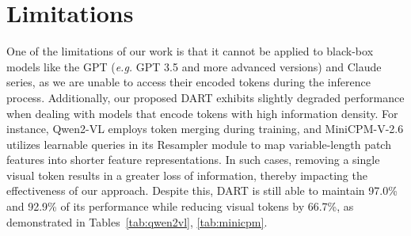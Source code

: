\section{Limitations}
One of the limitations of our work is that it cannot be applied to black-box models like the GPT (\emph{e.g.} GPT 3.5 and more advanced versions) and Claude series, as we are unable to access their encoded tokens during the inference process. Additionally, our proposed DART exhibits slightly degraded performance when dealing with models that encode tokens with high information density. For instance, Qwen2-VL employs token merging during training, and MiniCPM-V-2.6 utilizes learnable queries in its Resampler module to map variable-length patch features into shorter feature representations. In such cases, removing a single visual token results in a greater loss of information, thereby impacting the effectiveness of our approach. Despite this, DART is still able to maintain 97.0\% and 92.9\% of its performance while reducing visual tokens by 66.7\%, as demonstrated in Tables~\ref{tab:qwen2vl}, \ref{tab:minicpm}.